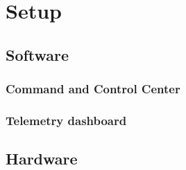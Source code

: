 
\chapter{Setup}


\section{Software}

\subsection{Command and Control Center}

\subsection{Telemetry dashboard}

\section{Hardware}


